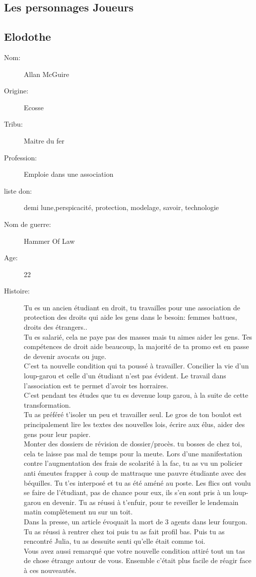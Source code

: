 \documentclass[oneside,12pt]{book}
\begin{document}
\begin{flushleft}
\clearpage
\chapter{Les personnages Joueurs}
\clearpage
\section{Elodothe}
\begin{description}
\item[Nom:]{Allan McGuire}
\item[Origine:]{Ecosse}
\item[Tribu:]{Maitre du fer}
\item[Profession:]{Emploie dans une association}
\item[liste don:]{demi lune,perspicacité, protection, modelage, savoir, technologie}
\item[Nom de guerre:]{Hammer Of Law}
\item[Age:]{22}
\item[Histoire:]{ 
    Tu es un ancien étudiant en droit, tu travailles pour une association de protection des droits qui aide les gens dans le besoin: femmes battues, droits des étrangers..\\
    Tu es salarié, cela ne paye pas des masses mais tu aimes aider les gens. Tes compétences de droit aide beaucoup, la majorité de ta promo est en passe de devenir avocats ou juge.\\ C'est ta nouvelle condition qui ta poussé à travailler. Concilier la vie d'un loup-garou et celle d'un étudiant n'est pas évident. Le travail dans l'association est te permet d'avoir tes horraires.  \\
C'est pendant tes études que tu es devenue loup garou, à la suite de cette transformation.\\
    Tu as préféré t'isoler un peu et travailler seul. Le gros de ton boulot est principalement lire les textes des nouvelles lois, écrire aux élus, aider des gens pour leur papier. \\
 Monter des dossiers de révision de dossier/procès. tu bosses de chez toi, cela te laisse pas mal de temps pour la meute. 
Lors d'une manifestation contre l'augmentation des frais de scolarité à la fac, tu as vu un policier anti émeutes frapper à coup de mattraque une pauvre étudiante avec des béquilles. Tu t'es interposé et tu as été améné au poste. Les flics ont voulu se faire de l'étudiant, pas de chance pour eux, ils s'en sont pris à un loup-garou en devenir. Tu as réussi à t'enfuir, pour te reveiller le lendemain matin complètement nu sur un toit. \\ 
Dans la presse, un article évoquait la mort de 3 agents dans leur fourgon. Tu as réussi à rentrer chez toi puis tu as fait profil bas. Puis tu as rencontré Julia, tu as dessuite senti qu'elle était comme toi.\\ 
Vous avez aussi remarqué que votre nouvelle condition attiré tout un tas de chose étrange autour de vous. Ensemble c'était plus facile de réagir face à ces nouveautés. \\

}
\end{description}
\end{flushleft}
\end{document}
